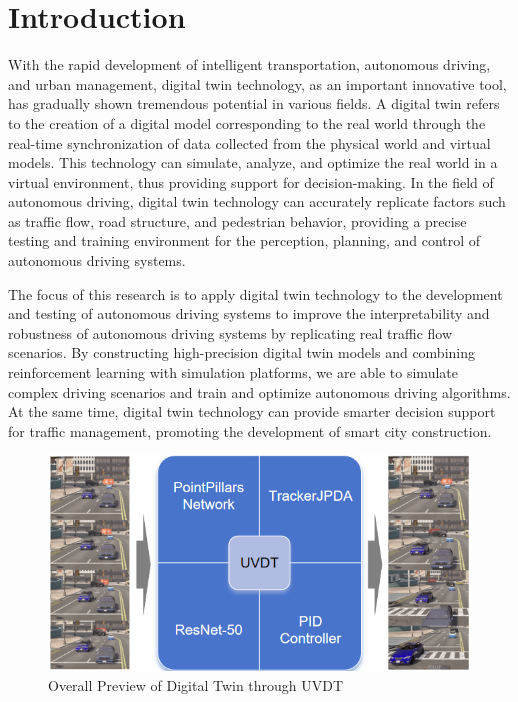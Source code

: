 \section{Introduction}
\label{sec:intro}

With the rapid development of intelligent transportation, autonomous driving, and urban management, digital twin technology, as an important innovative tool, has gradually shown tremendous potential in various fields\cite{Alpher17}. 
A digital twin refers to the creation of a digital model corresponding to the real world through the real-time synchronization of data collected from the physical world and virtual models\cite{Alpher20c}. 
This technology can simulate, analyze, and optimize the real world in a virtual environment, thus providing support for decision-making\cite{Alpher21b}. 
In the field of autonomous driving, digital twin technology can accurately replicate factors such as traffic flow, road structure, and pedestrian behavior, providing a precise testing and training environment for the perception, planning, and control of autonomous driving systems\cite{Alpher24}\cite{Alpher20d}.

The focus of this research is to apply digital twin technology to the development and testing of autonomous driving systems to improve the interpretability and robustness of autonomous driving systems by replicating real traffic flow scenarios\cite{Alpher24b}.
By constructing high-precision digital twin models and combining reinforcement learning with simulation platforms, we are able to simulate complex driving scenarios and train and optimize autonomous driving algorithms\cite{Alpher22c}. 
At the same time, digital twin technology can provide smarter decision support for traffic management, promoting the development of smart city construction\cite{Alpher17b}.

\begin{figure}[t]
	\centering
	\includegraphics[width=\linewidth]{picture/picture1.png} 
	\caption{Overall Preview of Digital Twin through UVDT} 
	\label{fig:example} 
\end{figure}

